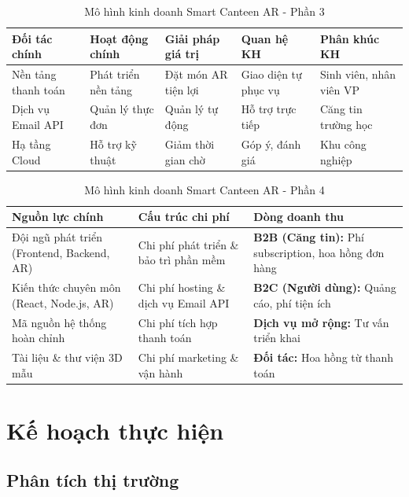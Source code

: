 \documentclass[12pt,a4paper]{article}
\begin{document}
\begin{table}[H]
\centering
\caption{Mô hình kinh doanh Smart Canteen AR - Phần 3}
\label{tab:lean-canvas-3}
\begin{tabular}{|p{2.8cm}|p{2.8cm}|p{2.8cm}|p{2.8cm}|p{2.8cm}|} %
\hline
\textbf{Đối tác chính} & \textbf{Hoạt động chính} & \textbf{Giải pháp giá trị} & \textbf{Quan hệ KH} & \textbf{Phân khúc KH} \\
\hline
Nền tảng thanh toán & Phát triển nền tảng & Đặt món AR tiện lợi & Giao diện tự phục vụ & Sinh viên, nhân viên VP \\
\hline
Dịch vụ Email API & Quản lý thực đơn & Quản lý tự động & Hỗ trợ trực tiếp & Căng tin trường học \\
\hline
Hạ tầng Cloud & Hỗ trợ kỹ thuật & Giảm thời gian chờ & Góp ý, đánh giá & Khu công nghiệp \\
\hline
\end{tabular}
\end{table}

\begin{table}[H]
\centering
\caption{Mô hình kinh doanh Smart Canteen AR - Phần 4}
\label{tab:lean-canvas-4}
\begin{tabular}{|p{5cm}|p{5cm}|p{5cm}|}
\hline
\textbf{Nguồn lực chính} & \textbf{Cấu trúc chi phí} & \textbf{Dòng doanh thu} \\
\hline
Đội ngũ phát triển (Frontend, Backend, AR) & Chi phí phát triển \& bảo trì phần mềm & \textbf{B2B (Căng tin):} Phí subscription, hoa hồng đơn hàng \\
\hline
Kiến thức chuyên môn (React, Node.js, AR) & Chi phí hosting \& dịch vụ Email API & \textbf{B2C (Người dùng):} Quảng cáo, phí tiện ích \\
\hline
Mã nguồn hệ thống hoàn chỉnh & Chi phí tích hợp thanh toán & \textbf{Dịch vụ mở rộng:} Tư vấn triển khai \\
\hline
Tài liệu \& thư viện 3D mẫu & Chi phí marketing \& vận hành & \textbf{Đối tác:} Hoa hồng từ thanh toán \\
\hline
\end{tabular}
\end{table}


\section{Kế hoạch thực hiện}

\subsection{Phân tích thị trường}
\end{document}
